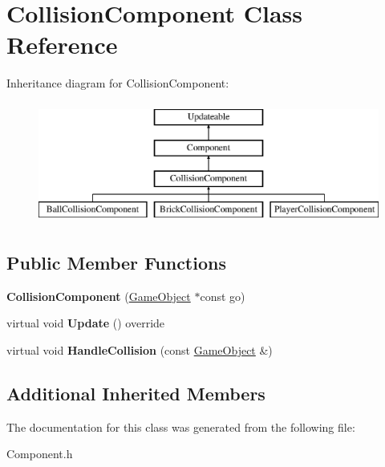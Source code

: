 \hypertarget{class_collision_component}{}\section{Collision\+Component Class Reference}
\label{class_collision_component}
Inheritance diagram for Collision\+Component\+:\begin{figure}[H]
\begin{center}
\leavevmode
\includegraphics[height=4.000000cm]{class_collision_component}
\end{center}
\end{figure}
\subsection*{Public Member Functions}
\begin{DoxyCompactItemize}
\item 
\hypertarget{class_collision_component_a59f812bb26b98b655b822b667b07faf4}{}{\bfseries Collision\+Component} (\hyperlink{class_game_object}{Game\+Object} $\ast$const go)\label{class_collision_component_a59f812bb26b98b655b822b667b07faf4}

\item 
\hypertarget{class_collision_component_a182926fa0c68d147a06e510ef06c24e4}{}virtual void {\bfseries Update} () override\label{class_collision_component_a182926fa0c68d147a06e510ef06c24e4}

\item 
\hypertarget{class_collision_component_affd40acce224837439308535f329ccd9}{}virtual void {\bfseries Handle\+Collision} (const \hyperlink{class_game_object}{Game\+Object} \&)\label{class_collision_component_affd40acce224837439308535f329ccd9}

\end{DoxyCompactItemize}
\subsection*{Additional Inherited Members}


The documentation for this class was generated from the following file\+:\begin{DoxyCompactItemize}
\item 
Component.\+h\end{DoxyCompactItemize}
